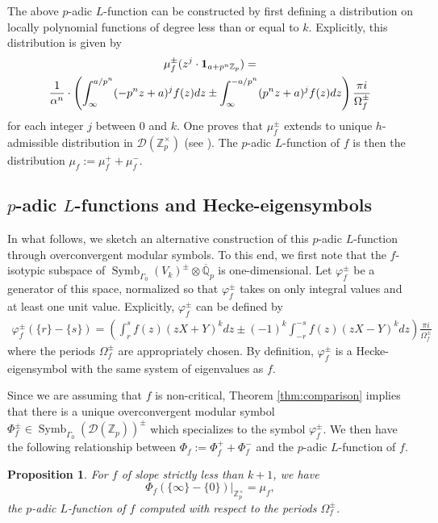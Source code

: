 \documentclass{amsart}
\theoremstyle{plain}
\newtheorem{prop}[thm]{Proposition}
\theoremstyle{definition}
\newcommand{\D}{{\mathcal D}}
\newcommand{\Z}{{\mathbb Z}}
\newcommand{\Q}{{\mathbb Q}}
\newcommand{\Qpbar}{\overline{{\Q}}_p}
\newcommand{\Zp}{\Z_p}
\newcommand{\Zpx}{\Z_p^\times}
\newcommand{\Dla}{\D(\Zp)}
\DeclareMathOperator{\Symb}{Symb}
\newcommand{\MSo}[1]{\Symb_{\Gamma_0}(#1)}
\begin{document}
The above $p$-adic $L$-function can be constructed by first defining a distribution on locally polynomial functions of degree less than or equal to $k$.  Explicitly, this distribution is given by
\begin{multline}
\label{eqn:pL}
\mu^\pm_f(z^j \cdot {\bf 1}_{a+p^n\Zp}) = \\
\frac{1}{\alpha^n} \cdot 
 \left(  \int_\infty^{a/p^n} (-p^nz+a)^j f(z) dz \pm \int_{\infty}^{-a/p^n} (p^nz+a)^j f(z) dz \right) \frac{\pi i}{\Omega^\pm_f}
\end{multline}
for each integer $j$ between $0$ and $k$.  One proves that $\mu^\pm_f$ extends to unique $h$-admissible distribution in $\D(\Zpx)$ (see \cite{AV,Visik,MTT}).   The $p$-adic $L$-function of $f$ is then the distribution $\mu_f := \mu^+_f + \mu^-_f$.

\subsection{$p$-adic $L$-functions and Hecke-eigensymbols}

In what follows, we sketch an alternative construction of this $p$-adic $L$-function through overconvergent modular symbols.  To this end, we first note that the $f$-isotypic subspace of  $\MSo{V_k}^\pm \otimes \Qpbar$ is one-dimensional.  Let $\varphi_f^\pm$ be a generator of this space, normalized so that $\varphi_f^\pm$ takes on only integral values and at least one unit value.  Explicitly, $\varphi_f^\pm$ can be defined by
\begin{multline*}
\varphi^\pm_f(\{r\} - \{s\}) = 
 \left(  \int_r^{s} f(z) (zX+Y)^k dz \pm (-1)^k \int_{-r}^{-s} f(z) (zX-Y)^k dz \right) \frac{\pi i}{\Omega^\pm_f}
\end{multline*}
where the periods $\Omega_f^\pm$ are appropriately chosen.  By definition, $\varphi^\pm_f$ is a Hecke-eigensymbol with the same system of eigenvalues as $f$.

Since we are assuming that $f$ is non-critical, Theorem \ref{thm:comparison} implies that there is a unique overconvergent modular symbol $\Phi^\pm_f \in \MSo{\Dla}^\pm$ which specializes to the symbol $\varphi^\pm_f$.  We then have the following relationship between $\Phi_f := \Phi^+_f + \Phi^-_f$ and the $p$-adic $L$-function of $f$.

\begin{prop}
\label{prop:OMStoPL}
For $f$ of slope strictly less than $k+1$, we have
$$
\Phi_f(\{\infty\} - \{0 \})\big|_{\Zpx} = \mu_f,
$$
the $p$-adic $L$-function of $f$ computed with respect to the periods $\Omega^\pm_f$.
\end{prop}
\end{document}
